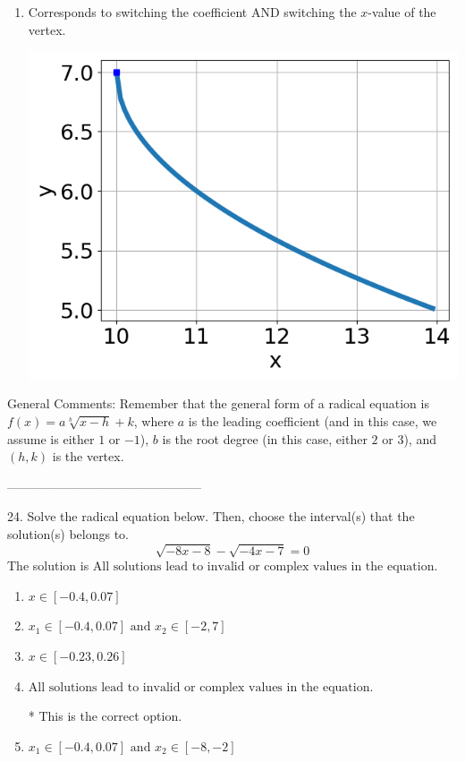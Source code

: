 \documentclass{article}[10pt]
\begin{document}
\begin{enumerate}[label=\Alph*.]
\item Corresponds to switching the coefficient AND switching the $x$-value of the vertex. 
\begin{center}\includegraphics[scale=0.5]{../Figures/question23BA.png}\end{center} 
 
\end{enumerate} 
 
General Comments: Remember that the general form of a radical equation is $ f(x) = a \sqrt[b]{x - h} + k$, where $a$ is the leading coefficient (and in this case, we assume is either $1$ or $-1$), $b$ is the root degree (in this case, either $2$ or $3$), and $(h, k)$ is the vertex.

-----------------------------------------------

24. Solve the radical equation below. Then, choose the interval(s) that the solution(s) belongs to.
$$ \sqrt{-8 x - 8} - \sqrt{-4 x - 7} = 0 $$ 
The solution is $ \text{All solutions lead to invalid or complex values in the equation.} $ 

\begin{enumerate}[label=\Alph*.] 
\item $ x \in [-0.4,0.07] $ 

  
\item $ x_1 \in [-0.4, 0.07] \text{ and } x_2 \in [-2,7] $ 

  
\item $ x \in [-0.23,0.26] $ 

  
\item $ \text{All solutions lead to invalid or complex values in the equation.} $ 

 * This is the correct option. 
\item $ x_1 \in [-0.4, 0.07] \text{ and } x_2 \in [-8,-2] $ 

  
\end{enumerate} 
 
\end{document}
